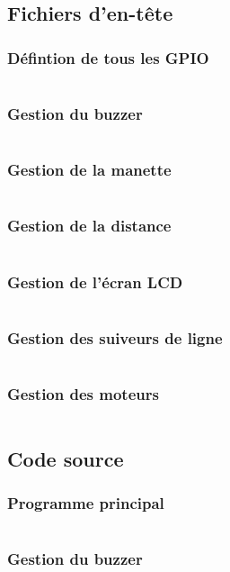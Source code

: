 \subsection{Fichiers d'en-tête}
    \subsubsection{Défintion de tous les GPIO}
        \inputminted[breaklines]{c}{code/include/gpioPins.h}
    \subsubsection{Gestion du buzzer}
        \inputminted[breaklines]{c}{code/include/buzzer.h}
    \subsubsection{Gestion de la manette}
        \inputminted[breaklines]{c}{code/include/controller.h}
    \subsubsection{Gestion de la distance}
        \inputminted[breaklines]{c}{code/include/distance.h}
    \subsubsection{Gestion de l'écran LCD}
        \inputminted[breaklines]{c}{code/include/i2cLCD.h}
    \subsubsection{Gestion des suiveurs de ligne}
        \inputminted[breaklines]{c}{code/include/lineFinder.h}
    \subsubsection{Gestion des moteurs}
        \inputminted[breaklines]{c}{code/include/motors.h}
\subsection{Code source}
    \subsubsection{Programme principal}
        \inputminted[breaklines]{c}{code/src/main.c}
    \subsubsection{Gestion du buzzer}
        \inputminted[breaklines]{c}{code/src/buzzer.c}
